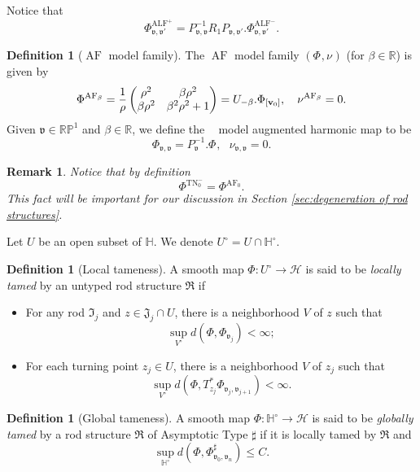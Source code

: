 \documentclass[a4paper,11pt]{amsart}
\newtheorem{remark}[theorem]{Remark}
\theoremstyle{definition}
\newtheorem{definition}[theorem]{Definition}
\numberwithin{equation}{section}
\newcommand{\dH}{\mathbb{H}}
\newcommand{\R}{\mathbb{R}}
\newcommand{\dP}{\mathbb{P}}
\newcommand{\mv} {\mathfrak v}
\newcommand{\mI} {\mathfrak I}
\newcommand{\mJ} {\mathfrak J}
\newcommand{\mR} {\mathfrak R}
\DeclareMathOperator{\bv}{{\bf v}}
\DeclareMathOperator{\ALF}{ALF}
\DeclareMathOperator{\TN}{TN}
\DeclareMathOperator{\AF}{AF}
\DeclareMathOperator{\AFa}{AF_\beta}
\begin{document}
Notice that $$\Phi_{\mv, \mv'}^{\ALF^+}=P_{\mv, \mv}^{-1}R_1P_{\mv, \mv'}. \Phi_{\mv, \mv'}^{\ALF^-}.$$

\begin{definition}[$\AF$ model family]\label{def:AF model family}
    The $\AF$ model family $(\Phi^{\AFa}, \nu^{\AFa})$ (for $\beta\in \R$)
is given by \begin{equation}
	\Phi^{\AFa}=\frac{1}{\rho}\left(\begin{matrix}\rho^2&\beta\rho^2\\\beta\rho^2&\beta^2\rho^2+1\end{matrix}\right)=U_{-\beta}. \Phi_{[\bv_0]}, \quad \nu^{\AFa}=0.
\end{equation}
Given $\mv\in \R\dP^1$ and $\beta\in \R$,  we define the $\AFa$ model augmented harmonic map to be
\begin{equation}\label{e:definition of Phi AFa in general}\Phi_{\mv, \mv}^{\AFa}=P_{\mv}^{-1}. \Phi^{\AFa}, \ \ \  \nu_{\mv, \mv}^{\AFa}=0.
\end{equation}
\end{definition} 

\begin{remark}
    Notice that by definition $$\Phi^{\TN^-_0}=\Phi^{\AF_0}.$$
    This fact will be important for our discussion in Section \ref{sec:degeneration of rod structures}.
\end{remark}



Let $U$ be an open subset of $\dH$. We denote $U^\circ=U\cap \dH^\circ$.
\begin{definition}[Local tameness] \label{def:local tameness}
A smooth map $\Phi: U^\circ\rightarrow \mathcal H$ is said to be  \emph{locally tamed} by an untyped rod structure $\mR$ if 
\begin{itemize}
	\item For any rod $\mI_j$ and $z\in \mJ_j\cap U$, there is a neighborhood $V$ of $z$ such that $$\sup_{V^\circ}d(\Phi,\Phi_{\mv_j})<\infty;$$
	\item For each turning point $z_j\in U$,  there is a neighborhood $V$ of $z_j$ such that   $$\sup_{V^\circ}d(\Phi,T_{z_j}^*\Phi_{\mv_{j}, \mv_{j+1}})<\infty.$$ 
\end{itemize}
\end{definition}


\begin{definition}[Global tameness]

A smooth map $\Phi: \dH^\circ\rightarrow \mathcal H$ is said to be \emph{globally tamed} by a rod structure $\mR$ of  Asymptotic Type  $\sharp$ if it is locally tamed by $\mR$ and $$\sup_{\dH^\circ}d(\Phi,\Phi^{\sharp}_{\mv_0, \mv_n})\leq C.$$
  \end{definition}
\end{document}
